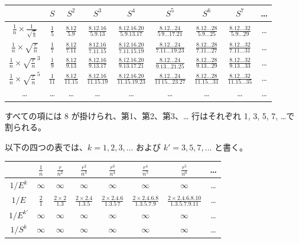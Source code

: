 \documentclass[11pt]{article}
\newcommand{\scanpage}[2]{\clearpage\setcounter{footnote}{0}\noindent{\footnotesize\color{gray}PDF #1 頁 · #2}\par\medskip}
\begin{document}
\scanpage{0287}{印刷頁 273}
\begin{center}
\renewcommand{\arraystretch}{2}
\begin{tabular}{|c||c|c|c|c|c|c|c|c|}
\hline
 & $S$ & $S^{2}$ & $S^{3}$ & $S^{4}$ & $S^{5}$ & $S^{6}$ & $S^{7}$ & \ldots\\
\hline\hline
$\frac{1}{n}\times\frac{1}{\sqrt{\frac{r}{n}}}$ & $\frac{1}{5}$ & $\frac{8.12}{5.9}$ & $\frac{8.12.16}{5.9.13}$ & $\frac{8.12.16.20}{5.9.13.17}$ & $\frac{8.12\ldots24}{5\,9\ldots17.21}$ & $\frac{8.12\ldots28}{5.9\ldots25}$ & $\frac{8.12\ldots32}{5.9\ldots29}$ & \ldots\\
\hline
$\frac{1}{n}\times\sqrt{\frac{r}{n}}$ & $\frac{1}{7}$ & $\frac{8.12}{7.11}$ & $\frac{8\,12.16}{7.11.15}$ & $\frac{8.12.16.20}{7.11.15.19}$ & $\frac{8.12\ldots24}{7.11\ldots19.23}$ & $\frac{8.12\ldots28}{7.11\ldots27}$ & $\frac{8.12\ldots32}{7.11\ldots31}$ & \ldots\\
\hline
$\frac{1}{n}\times\sqrt{\frac{r}{n}}^{\,3}$ & $\frac{1}{9}$ & $\frac{8.12}{9.13}$ & $\frac{8.12.16}{9.13.17}$ & $\frac{8.12.16.20}{9.13.17.21}$ & $\frac{8.12\ldots24}{9.13\ldots21.25}$ & $\frac{8.12\ldots28}{9.13\ldots29}$ & $\frac{8.12\ldots32}{9.13\ldots33}$ & \ldots\\
\hline
$\frac{1}{n}\times\sqrt{\frac{r}{n}}^{\,5}$ & $\frac{1}{11}$ & $\frac{8.12}{11.15}$ & $\frac{8.12.16}{11.15.19}$ & $\frac{8.12.16.20}{11.15.19.23}$ & $\frac{8.12\ldots24}{11\,15\ldots23.27}$ & $\frac{8.12\ldots28}{11.15\ldots31}$ & $\frac{8.12\ldots32}{11.15\ldots35}$ & \ldots\\
\hline
\ldots & \ldots & \ldots & \ldots & \ldots & \ldots & \ldots & \ldots & \ldots\\
\hline
\end{tabular}
\end{center}

すべての項には 8 が掛けられ、第1、第2、第3、\ldots{} 行はそれぞれ 1, 3, 5, 7, \ldots で割られる。

以下の四つの表では、$k = 1, 2, 3, \ldots$ および $k' = 3, 5, 7, \ldots$ と書く。

\begin{center}
\renewcommand{\arraystretch}{2}
\begin{tabular}{|c||c|c|c|c|c|c|c|}
\hline
 & $\frac{1}{n}$ & $\frac{r}{n^{2}}$ & $\frac{r^{2}}{n^{3}}$ & $\frac{r^{3}}{n^{4}}$ & $\frac{r^{4}}{n^{5}}$ & $\frac{r^{5}}{n^{6}}$ & \ldots\\
\hline\hline
$1/E^{k}$ & $\infty$ & $\infty$ & $\infty$ & $\infty$ & $\infty$ & $\infty$ & \ldots\\
\hline
$1/E$ & $\frac{2}{1}$ & $\frac{2\times2}{1.3}$ & $\frac{2\times2.4}{1.3.5}$ & $\frac{2\times2.4.6}{1.3.5\,7}$ & $\frac{2\times2.4.6.8}{1.3.5.7.9}$ & $\frac{2\times2.4.6.8.10}{1.3.5.7.9.11}$ & \ldots\\
\hline
$1/E^{k'}$ & $\infty$ & $\infty$ & $\infty$ & $\infty$ & $\infty$ & $\infty$ & \ldots\\
\hline
$1/S^{k}$ & $\infty$ & $\infty$ & $\infty$ & $\infty$ & $\infty$ & $\infty$ & \ldots\\
\hline
\end{tabular}
\end{center}
\end{document}
